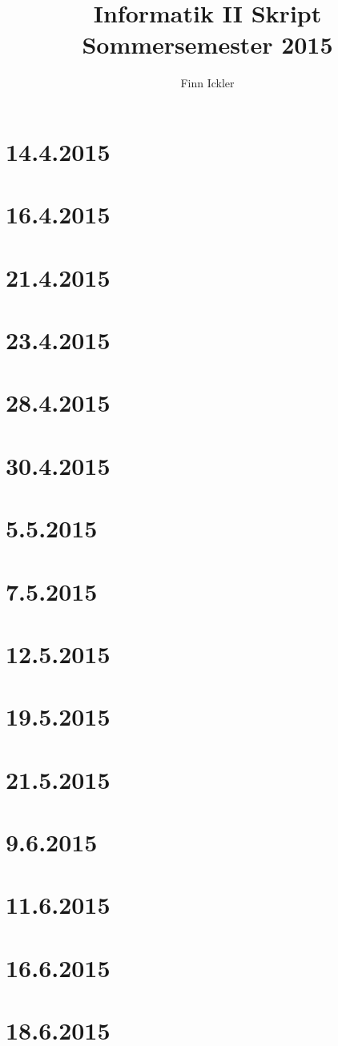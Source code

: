 \documentclass[a4paper,12pt,twoside]{article}
\author{Finn Ickler}
\title{Informatik II Skript Sommersemester 2015}
\begin{document}
	\graphicspath{{./Graphics/}}
\renewcommand{\underline}[1]{\emph{#1}}
\renewcommand{\uline}[1]{\emph{#1}}
\maketitle
\tableofcontents
\lstlistoflistings
\newpage
\section{14.4.2015}

\section{16.4.2015}

\section{21.4.2015}

\section{23.4.2015}

\section{28.4.2015}

\section{30.4.2015}

\section{5.5.2015}

\section{7.5.2015}

\pagebreak
\section{12.5.2015}

\section{19.5.2015}

\section{21.5.2015}

\section{9.6.2015}

\section{11.6.2015}

\newpage
\section{16.6.2015}

\section{18.6.2015}

\end{document}
